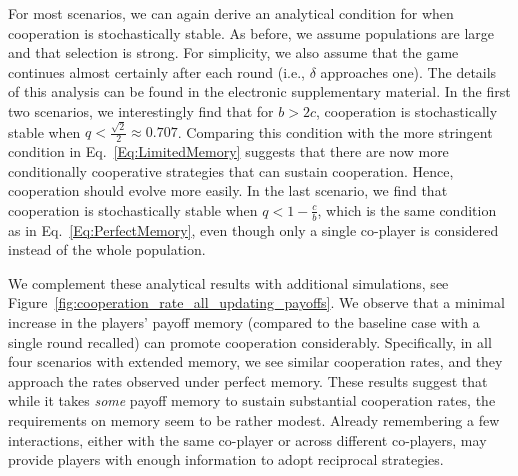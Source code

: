 \documentclass[11pt]{article}
\def\esm{electronic supplementary material}
\newcommand{\FigHigherMemory}{Figure~\ref{fig:cooperation_rate_all_updating_payoffs}}
\theoremstyle{plainCl1}
\theoremstyle{plainCl2}
\begin{document}

For most scenarios, we can again derive an analytical condition for when cooperation is stochastically stable. 
As before, we assume populations are large and that selection is strong. 
For simplicity, we also assume that the game continues almost certainly after each round (i.e., $\delta$ approaches one). 
The details of this analysis can be found in the \esm. 
In the first two scenarios, we interestingly find that for $b\!>\!2c$, cooperation is stochastically stable when $q\!<\! \frac{\sqrt{2}}{2}\approx 0.707$. 
Comparing this condition with the more stringent condition in Eq.~\eqref{Eq:LimitedMemory} suggests that there are now more conditionally cooperative strategies that can sustain cooperation. 
Hence, cooperation should evolve more easily.
In the last scenario, we find that cooperation is stochastically stable when \(q
< 1 - \frac{c}{b}\), which is the same condition as in
Eq.~\eqref{Eq:PerfectMemory}, even though only a single co-player is considered
instead of the whole population. 


We complement these analytical results with additional simulations, see \FigHigherMemory.
We observe that a minimal increase in the players' payoff memory (compared to the baseline case with a single round recalled) can promote cooperation considerably. 
Specifically, in all four scenarios with extended memory, we see similar cooperation rates, and they approach the rates observed under perfect memory. 
These results suggest that while it takes {\it some} payoff memory to sustain substantial cooperation rates, the requirements on memory seem to be rather modest. 
Already remembering a few interactions, either with the same co-player or across different co-players, may provide players with enough information to adopt reciprocal strategies. 



\end{document}
